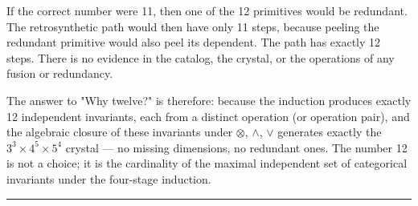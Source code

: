\documentclass[12pt,a4paper]{article}
\begin{document}
If the correct number were 11, then one of the 12 primitives would be redundant. The retrosynthetic path would then have only 11 steps, because peeling the redundant primitive would also peel its dependent. The path has exactly 12 steps. There is no evidence in the catalog, the crystal, or the operations of any fusion or redundancy.

The answer to "Why twelve?" is therefore: because the induction produces exactly 12 independent invariants, each from a distinct operation (or operation pair), and the algebraic closure of these invariants under $\otimes$, $\wedge$, $\vee$ generates exactly the $3^3 \times 4^5 \times 5^4$ crystal --- no missing dimensions, no redundant ones. The number 12 is not a choice; it is the cardinality of the maximal independent set of categorical invariants under the four-stage induction.

\begin{center}
\rule{0.5\textwidth}{0.4pt}
\end{center}
\end{document}
